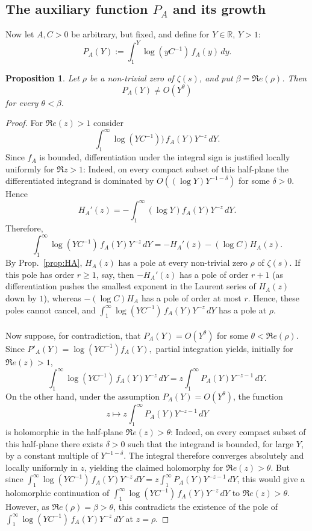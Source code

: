 \documentclass[a4paper,10pt]{amsart}
\newtheorem{proposition}[equation]{Proposition}
\theoremstyle{definition}
\numberwithin{equation}{section}
\def\R{\mathbb R}
\begin{document}
\subsection{The auxiliary function $P_A$ and its growth}
Now let $A,C>0$ be arbitrary, but fixed, and define for $Y\in\R$, $Y>1$:
\begin{equation}\label{eq:PAdef}
P_A(Y):=\int_1^Y\log(yC^{-1})\,f_A(y)\,dy.
\end{equation}

\begin{proposition}\label{prop:Omega}
Let $\rho$ be a non-trivial zero of $\zeta(s)$, and put $\beta=\Re e(\rho)$. Then
$$
P_A(Y)\neq O(Y^\theta)
$$
for every $\theta<\beta$.
\end{proposition}

\begin{proof}
For $\Re e(z)>1$ consider
$$
\int_1^\infty \log(YC^{-1}))\,f_A(Y)Y^{-z}\,dY.
$$
Since $f_A$ is bounded, differentiation under the integral sign is justified locally uniformly for $\Re z>1$: Indeed, on every compact subset of this half-plane the differentiated integrand is dominated by $O((\log Y)Y^{-1-\delta})$ for some $\delta>0$. Hence
$$
H_A'(z) = -\int_1^\infty (\log Y)f_A(Y)Y^{-z}\,dY.
$$
Therefore,
$$
\int_1^\infty \log(YC^{-1})\,f_A(Y)Y^{-z}\,dY = -H_A'(z)-(\log C)H_A(z).
$$
By Prop.\ \ref{prop:HA}, $H_A(z)$ has a pole at every non-trivial zero $\rho$ of $\zeta(s)$. If this pole has order $r\ge1$, say, then $-H_A'(z)$ has a pole of
order $r+1$ (as differentiation pushes the smallest exponent in the Laurent series of $H_A(z)$ down by $1$), whereas $-(\log C)H_A$ has a pole of order at most $r$.  Hence, these poles cannot cancel, and $\int_1^\infty \log(YC^{-1})\,f_A(Y)Y^{-z}\,dY$ has a pole at $\rho$.\\\\ 
Now suppose, for contradiction, that $P_A(Y)=O(Y^\theta)$ for some $\theta<\Re e(\rho)$. Since $P'_A(Y)=\log(YC^{-1})f_A(Y),$ partial integration yields, initially for $\Re e(z)>1$,
$$
\int_1^\infty \log(YC^{-1})\,f_A(Y)Y^{-z}\,dY=z\int_1^\infty P_A(Y)Y^{-z-1}\,dY.
$$
On the other hand, under the assumption $P_A(Y)=O(Y^\theta)$, the function
$$
z\longmapsto z\int_1^\infty P_A(Y)Y^{-z-1}\,dY
$$
is holomorphic in the half-plane $\Re e(z)>\theta$: Indeed, on every compact subset of this half-plane there exists $\delta>0$ such that the integrand is bounded, for large $Y$, by a constant multiple of $Y^{-1-\delta}$. The integral therefore converges absolutely and locally uniformly in $z$, yielding the claimed holomorphy for $\Re e(z)>\theta$.  But since $\int_1^\infty \log(YC^{-1})\,f_A(Y)Y^{-z}\,dY=z\int_1^\infty P_A(Y)Y^{-z-1}\,dY$, this would give a holomorphic continuation of $\int_1^\infty \log(YC^{-1})\,f_A(Y)Y^{-z}\,dY$ to $\Re e(z)>\theta$. However, as $\Re e(\rho)=\beta>\theta$, this contradicts the existence of the pole of $\int_1^\infty \log(YC^{-1})\,f_A(Y)Y^{-z}\,dY$ at $z=\rho$.
\end{proof}
\end{document}
